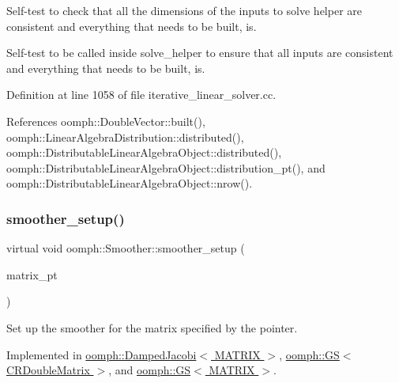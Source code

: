 Self-\/test to check that all the dimensions of the inputs to solve helper are consistent and everything that needs to be built, is. 

Self-\/test to be called inside solve\+\_\+helper to ensure that all inputs are consistent and everything that needs to be built, is. 

Definition at line 1058 of file iterative\+\_\+linear\+\_\+solver.\+cc.



References oomph\+::\+Double\+Vector\+::built(), oomph\+::\+Linear\+Algebra\+Distribution\+::distributed(), oomph\+::\+Distributable\+Linear\+Algebra\+Object\+::distributed(), oomph\+::\+Distributable\+Linear\+Algebra\+Object\+::distribution\+\_\+pt(), and oomph\+::\+Distributable\+Linear\+Algebra\+Object\+::nrow().

\mbox{\label{classoomph_1_1Smoother_a6eb7009ab3bebcccc83062cbe980bf91}} 
\subsubsection{\texorpdfstring{smoother\+\_\+setup()}{smoother\_setup()}}
{\footnotesize\ttfamily virtual void oomph\+::\+Smoother\+::smoother\+\_\+setup (\begin{DoxyParamCaption}\item[{\hyperlink{classoomph_1_1DoubleMatrixBase}{Double\+Matrix\+Base} $\ast$}]{matrix\+\_\+pt }\end{DoxyParamCaption})\hspace{0.3cm}{\ttfamily [pure virtual]}}



Set up the smoother for the matrix specified by the pointer. 



Implemented in \hyperlink{classoomph_1_1DampedJacobi_a8f136ac45998419c70708166b16a66e1}{oomph\+::\+Damped\+Jacobi$<$ M\+A\+T\+R\+I\+X $>$}, \hyperlink{classoomph_1_1GS_3_01CRDoubleMatrix_01_4_ab7762326bb595dc015a7504e1b9b996f}{oomph\+::\+G\+S$<$ C\+R\+Double\+Matrix $>$}, and \hyperlink{classoomph_1_1GS_a92a30b95c5ff0b2eefdc7730c822b6d5}{oomph\+::\+G\+S$<$ M\+A\+T\+R\+I\+X $>$}.

\mbox{\label{classoomph_1_1Smoother_a94899c8d7bf84c068cda8d312d195bfe}} 
